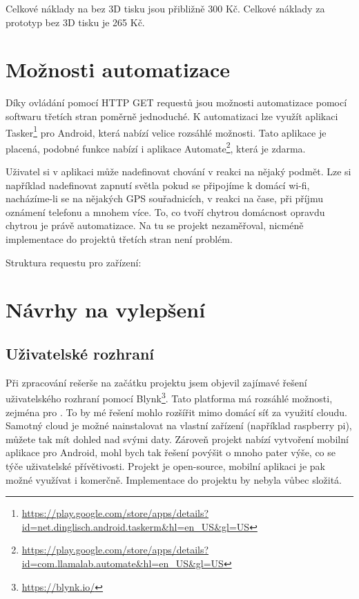 \documentclass[11pt,a4paper,twoside,openright]{report}
\begin{document}
	Celkové náklady na  bez 3D tisku jsou přibližně 300 Kč.
	Celkové náklady za prototyp  bez 3D tisku je 265 Kč.
	
	
	\section{Možnosti automatizace}
	Díky ovládání pomocí HTTP GET requestů jsou možnosti automatizace pomocí softwaru třetích stran poměrně jednoduché. K automatizaci lze využít aplikaci Tasker\footnote{\url{https://play.google.com/store/apps/details?id=net.dinglisch.android.taskerm&hl=en_US&gl=US}} pro Android, která nabízí velice rozsáhlé možnosti. Tato aplikace je placená, podobné funkce nabízí i aplikace Automate\footnote{\url{https://play.google.com/store/apps/details?id=com.llamalab.automate&hl=en_US&gl=US}}, která je zdarma. 
	
	
	Uživatel si v aplikaci může nadefinovat chování  v reakci na nějaký podmět. Lze si například nadefinovat zapnutí světla pokud se připojíme k domácí wi-fi, nacházíme-li se na nějakých GPS souřadnicích, v reakci na čase, při příjmu oznámení telefonu a mnohem více. To, co tvoří chytrou domácnost opravdu chytrou je právě automatizace. Na tu se projekt nezaměřoval, nicméně implementace do projektů třetích stran není problém.
	
	
	Struktura requestu pro zařízení:
	
	
	\section{Návrhy na vylepšení}
	\subsection{Uživatelské rozhraní}
	Při zpracování rešerše na začátku projektu jsem objevil zajímavé řešení uživatelského rozhraní pomocí Blynk\footnote{\url{https://blynk.io/}}. Tato platforma má rozsáhlé možnosti, zejména pro . To by mé řešení mohlo rozšířit mimo  domácí síť za využití cloudu. Samotný cloud je možné nainstalovat na vlastní zařízení (například raspberry pi), můžete tak mít dohled nad svými daty. Zároveň projekt nabízí vytvoření mobilní aplikace pro Android, mohl bych tak řešení povýšit o mnoho pater výše, co se týče uživatelské přívětivosti. Projekt je open-source, mobilní aplikaci je pak možné využívat i komerčně. Implementace do projektu by nebyla vůbec složitá.
	
\end{document}
